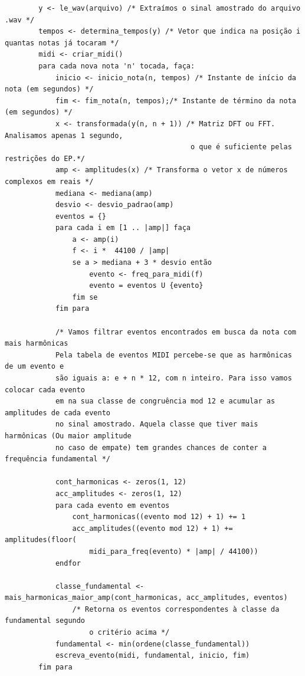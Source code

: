\documentclass[brazil,times]{abnt}
\begin{document}
	{\scriptsize
    \begin{verbatim}
        y <- le_wav(arquivo) /* Extraímos o sinal amostrado do arquivo .wav */
        tempos <- determina_tempos(y) /* Vetor que indica na posição i quantas notas já tocaram */
        midi <- criar_midi()
        para cada nova nota 'n' tocada, faça:
            inicio <- inicio_nota(n, tempos) /* Instante de início da nota (em segundos) */
            fim <- fim_nota(n, tempos);/* Instante de término da nota (em segundos) */
            x <- transformada(y(n, n + 1)) /* Matriz DFT ou FFT. Analisamos apenas 1 segundo, 
                                            o que é suficiente pelas restrições do EP.*/
            amp <- amplitudes(x) /* Transforma o vetor x de números complexos em reais */
            mediana <- mediana(amp)
            desvio <- desvio_padrao(amp)
            eventos = {}
            para cada i em [1 .. |amp|] faça
                a <- amp(i)
                f <- i *  44100 / |amp|
                se a > mediana + 3 * desvio então
                    evento <- freq_para_midi(f)
                    evento = eventos U {evento}
                fim se
            fim para
            
            /* Vamos filtrar eventos encontrados em busca da nota com mais harmônicas
            Pela tabela de eventos MIDI percebe-se que as harmônicas de um evento e
            são iguais a: e + n * 12, com n inteiro. Para isso vamos colocar cada evento
            em na sua classe de congruência mod 12 e acumular as amplitudes de cada evento
            no sinal amostrado. Aquela classe que tiver mais harmônicas (Ou maior amplitude
            no caso de empate) tem grandes chances de conter a frequência fundamental */
            
            cont_harmonicas <- zeros(1, 12)
            acc_amplitudes <- zeros(1, 12)
            para cada evento em eventos
                cont_harmonicas((evento mod 12) + 1) += 1
                acc_amplitudes((evento mod 12) + 1) += amplitudes(floor(
                    midi_para_freq(evento) * |amp| / 44100))
            endfor
            
            classe_fundamental <- mais_harmonicas_maior_amp(cont_harmonicas, acc_amplitudes, eventos)
                /* Retorna os eventos correspondentes à classe da fundamental segundo
                    o critério acima */
            fundamental <- min(ordene(classe_fundamental))
            escreva_evento(midi, fundamental, inicio, fim)
        fim para
    \end{verbatim}}
\end{document}
